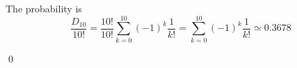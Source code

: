 
The probability is
\[
\frac{D_{10}}{10!}
= \frac{10!}{10!} \sum_{k=0}^{10} (-1)^k \frac{1}{k!}
= \sum_{k=0}^{10} (-1)^k \frac{1}{k!}
\simeq 0.3678
\]

\ANSWER
{}
\qed


